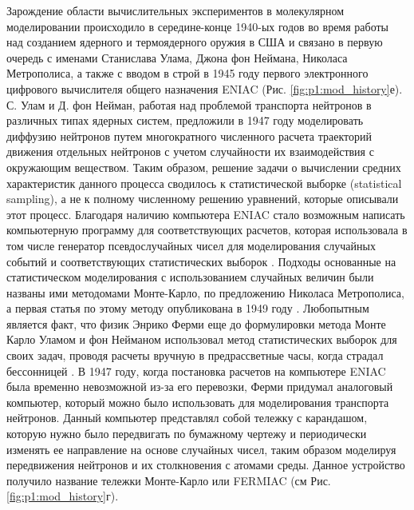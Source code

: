 Зарождение области вычислительных экспериментов в молекулярном моделировании происходило в середине-конце 1940-ых годов во время работы над созданием ядерного и термоядерного оружия в США  и связано в первую очередь с именами Станислава Улама, Джона фон Неймана, Николаса Метрополиса, а также с вводом в строй в 1945 году первого электронного цифрового вычислителя общего назначения ENIAC (Рис. \ref{fig:p1:mod_history}е). С. Улам и Д. фон Нейман, работая над проблемой транспорта нейтронов в различных типах ядерных систем, предложили в 1947 году моделировать диффузию нейтронов путем многократного численного расчета траекторий движения отдельных нейтронов с учетом случайности их взаимодействия с окружающим веществом. Таким образом, решение задачи о вычислении средних характеристик данного процесса сводилось к статистической выборке (statistical sampling), а не к полному численному решению уравнений, которые описывали этот процесс. Благодаря наличию компьютера ENIAC  стало возможным написать компьютерную программу для соответствующих расчетов, которая использовала в том числе генератор псевдослучайных чисел для моделирования случайных событий и соответствующих статистических выборок \cite{eckhardt_and_1987}.  Подходы основанные на статистическом моделирования с использованием случайных величин были названы ими методомами Монте-Карло, по предложению Николаса Метрополиса, а первая статья по этому методу опубликована в 1949 году \cite{metropolis_monte_1949}. Любопытным является факт, что физик Энрико Ферми еще до формулировки метода Монте Карло Уламом и фон Нейманом использовал метод статистических выборок для своих задач, проводя расчеты вручную в предрассветные часы, когда страдал бессонницей \cite{metropolis_beginnig_1987}. В 1947 году, когда постановка расчетов на компьютере ENIAC была временно невозможной из-за его перевозки, Ферми придумал аналоговый компьютер, который можно было использовать для моделирования транспорта нейтронов. Данный компьютер представлял собой тележку с карандашом, которую нужно было передвигать по бумажному чертежу и периодически изменять ее направление на основе случайных чисел, таким образом моделируя передвижения нейтронов и их столкновения с атомами среды. Данное устройство получило название тележки Монте-Карло или FERMIAC (см Рис. \ref{fig:p1:mod_history}г).


